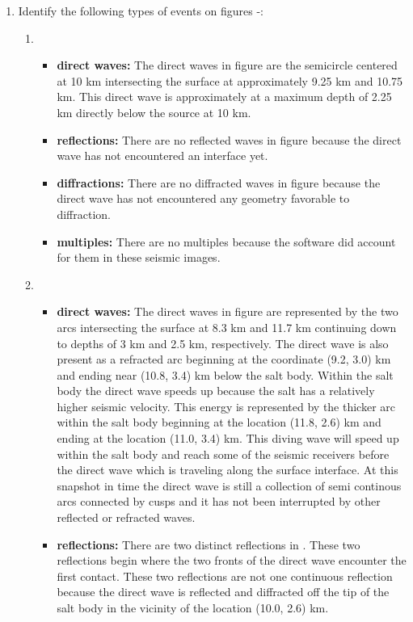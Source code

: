 \begin{enumerate}
  \item Identify the following types of events on figures -:
  \begin{enumerate}
    \item[\rfn{wfld0-04}]
    \begin{itemize}
      \item \textbf{direct waves:} The direct waves in figure  are the semicircle centered at 10 km intersecting the surface at approximately 9.25 km and 10.75 km. This direct wave is approximately at a maximum depth of 2.25 km directly below the source at 10 km. 
      \item \textbf{reflections:} There are no reflected waves in figure  because the direct wave has not encountered an interface yet.
      \item \textbf{diffractions:} There are no diffracted waves in figure  because the direct wave has not encountered any geometry favorable to diffraction.
      \item \textbf{multiples:} There are no multiples because the software did account for them in these seismic images.
    \end{itemize}
    \item[\rfn{wfld0-08}]
    \begin{itemize}
      \item \textbf{direct waves:} The direct waves in figure  are represented by the two arcs intersecting the surface at 8.3 km and 11.7 km continuing down to depths of 3 km and 2.5 km, respectively. The direct wave is also present as a refracted arc beginning at the coordinate (9.2, 3.0) km and ending near (10.8, 3.4) km below the salt body. Within the salt body the direct wave speeds up because the salt has a relatively higher seismic velocity. This energy is represented by the thicker arc within the salt body beginning at the location (11.8, 2.6) km and ending at the location (11.0, 3.4) km. This diving wave will speed up within the salt body and reach some of the seismic receivers before the direct wave which is traveling along the surface interface. At this snapshot in time the direct wave is still a collection of semi continous arcs connected by cusps and it has not been interrupted by other reflected or refracted waves.
      \item \textbf{reflections:} There are two distinct reflections in . These two reflections begin where the two fronts of the direct wave encounter the first contact. These two reflections are not one continuous reflection because the direct wave is reflected and diffracted off the tip of the salt body in the vicinity of the location (10.0, 2.6) km.

\end{itemize}
\end{enumerate}
\end{enumerate}

